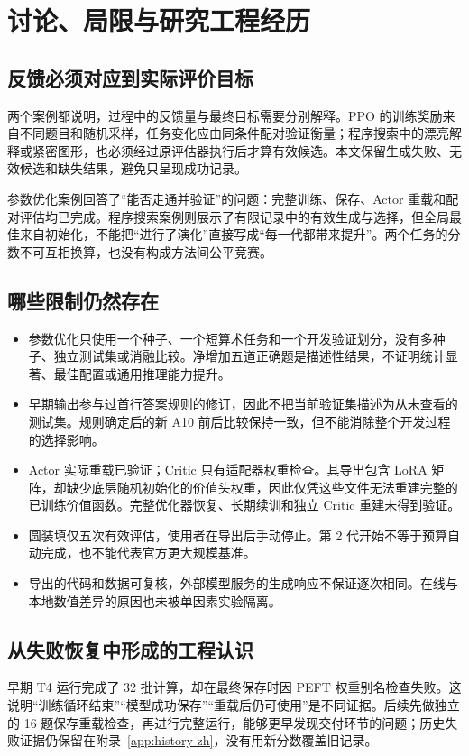 \section{讨论、局限与研究工程经历}
\subsection{反馈必须对应到实际评价目标}
两个案例都说明，过程中的反馈量与最终目标需要分别解释。PPO 的训练奖励来自不同题目和随机采样，任务变化应由同条件配对验证衡量；程序搜索中的漂亮解释或紧密图形，也必须经过原评估器执行后才算有效候选。本文保留生成失败、无效候选和缺失结果，避免只呈现成功记录。

参数优化案例回答了“能否走通并验证”的问题：完整训练、保存、Actor 重载和配对评估均已完成。程序搜索案例则展示了有限记录中的有效生成与选择，但全局最佳来自初始化，不能把“进行了演化”直接写成“每一代都带来提升”。两个任务的分数不可互相换算，也没有构成方法间公平竞赛。

\subsection{哪些限制仍然存在}
\begin{itemize}
\item {}参数优化只使用一个种子、一个短算术任务和一个开发验证划分，没有多种子、独立测试集或消融比较。净增加五道正确题是描述性结果，不证明统计显著、最佳配置或通用推理能力提升。
\item {}早期输出参与过首行答案规则的修订，因此不把当前验证集描述为从未查看的测试集。规则确定后的新 A10 前后比较保持一致，但不能消除整个开发过程的选择影响。
\item {}Actor 实际重载已验证；Critic 只有适配器权重检查。其导出包含 LoRA 矩阵，却缺少底层随机初始化的价值头权重，因此仅凭这些文件无法重建完整的已训练价值函数。完整优化器恢复、长期续训和独立 Critic 重建未得到验证。
\item {}圆装填仅五次有效评估，使用者在导出后手动停止。第 2 代开始不等于预算自动完成，也不能代表官方更大规模基准。
\item {}导出的代码和数据可复核，外部模型服务的生成响应不保证逐次相同。在线与本地数值差异的原因也未被单因素实验隔离。
\end{itemize}

\subsection{从失败恢复中形成的工程认识}
早期 T4 运行完成了 32 批计算，却在最终保存时因 PEFT 权重别名检查失败。这说明“训练循环结束”“模型成功保存”“重载后仍可使用”是不同证据。后续先做独立的 16 题保存重载检查，再进行完整运行，能够更早发现交付环节的问题；历史失败证据仍保留在附录~\ref{app:history-zh}，没有用新分数覆盖旧记录。

